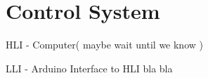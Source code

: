 \section{Control System}

HLI - Computer( maybe wait until we know )

LLI - Arduino Interface to HLI bla bla

